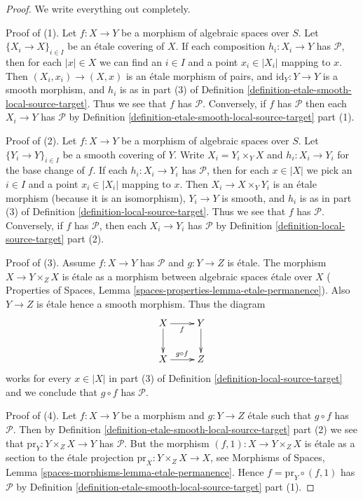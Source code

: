 \documentclass[10pt,a4paper]{amsart}
\theoremstyle{plain}
\theoremstyle{definition}
\theoremstyle{remark}
\numberwithin{equation}{subsection}
\begin{document}
\begin{proof}
We write everything out completely.

\medskip\noindent
Proof of (1). Let $f : X \to Y$ be a morphism of algebraic spaces over $S$.
Let $\{X_i \to X\}_{i \in I}$ be an \'etale covering of $X$. If each composition
$h_i : X_i \to Y$ has $\mathcal{P}$, then for each $|x| \in X$ we can find
an $i \in I$ and a point $x_i \in |X_i|$ mapping to $x$. Then
$(X_i, x_i) \to (X, x)$ is an \'etale morphism of pairs, and
$\text{id}_Y : Y \to Y$ is a smooth morphism, and $h_i$ is as in part (3) of
Definition \ref{definition-etale-smooth-local-source-target}.
Thus we see that $f$ has $\mathcal{P}$.
Conversely, if $f$ has $\mathcal{P}$ then each $X_i \to Y$ has
$\mathcal{P}$ by
Definition \ref{definition-etale-smooth-local-source-target} part (1).

\medskip\noindent
Proof of (2). Let $f : X \to Y$ be a morphism of algebraic spaces over $S$.
Let $\{Y_i \to Y\}_{i \in I}$ be a smooth covering of $Y$.
Write $X_i = Y_i \times_Y X$ and $h_i : X_i \to Y_i$ for the base change
of $f$. If each  $h_i : X_i \to Y_i$ has $\mathcal{P}$, then for each
$x \in |X|$ we pick an $i \in I$ and a point $x_i \in |X_i|$ mapping to $x$.
Then $X_i \to X \times_Y Y_i$ is an \'etale morphism
(because it is an isomorphism), $Y_i \to Y$ is
smooth, and $h_i$ is as in part (3) of
Definition \ref{definition-local-source-target}.
Thus we see that $f$ has $\mathcal{P}$.
Conversely, if $f$ has $\mathcal{P}$, then each $X_i \to Y_i$ has
$\mathcal{P}$ by
Definition \ref{definition-local-source-target} part (2).

\medskip\noindent
Proof of (3). Assume $f : X \to Y$ has $\mathcal{P}$ and $g : Y \to Z$ is
\'etale. The morphism $X \to Y \times_Z X$ is \'etale as a morphism
between algebraic spaces \'etale over $X$ (
Properties of Spaces, Lemma \ref{spaces-properties-lemma-etale-permanence}).
Also $Y \to Z$ is \'etale hence a smooth morphism.
Thus the diagram
$$
\xymatrix{
X \ar[d] \ar[r]_f & Y \ar[d] \\
X \ar[r]^{g \circ f} & Z
}
$$
works for every $x \in |X|$ in part (3) of
Definition \ref{definition-local-source-target}
and we conclude that $g \circ f$ has $\mathcal{P}$.

\medskip\noindent
Proof of (4). Let $f : X \to Y$ be a morphism and $g : Y \to Z$ \'etale
such that $g \circ f$ has $\mathcal{P}$. Then by
Definition \ref{definition-etale-smooth-local-source-target} part (2)
we see that $\text{pr}_Y : Y \times_Z X \to Y$ has $\mathcal{P}$. But
the morphism $(f, 1) : X \to Y \times_Z X$ is \'etale as a section to the
\'etale projection $\text{pr}_X : Y \times_Z X \to X$, see
Morphisms of Spaces, Lemma \ref{spaces-morphisms-lemma-etale-permanence}.
Hence $f = \text{pr}_Y \circ (f, 1)$ has $\mathcal{P}$ by
Definition \ref{definition-etale-smooth-local-source-target} part (1).
\end{proof}
\end{document}
